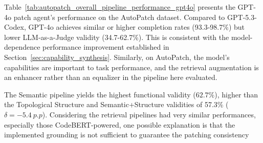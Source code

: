 Table~\ref{tab:autopatch_overall_pipeline_performance_gpt4o} presents the GPT-4o patch agent's performance on the AutoPatch dataset. Compared to GPT-5.3-Codex, GPT-4o achieves similar or higher completion rates (93.3-98.7\%) but lower LLM-as-a-Judge validity (34.7-62.7\%). 
This is consistent with the model-dependence performance improvement established in Section~\ref{sec:capability_synthesis}.
Similarly, on AutoPatch, the model's capabilities are important to task performance, and the retrieval augmentation is an enhancer rather than an equalizer in the pipeline here evaluated.

The Semantic pipeline yields the highest functional validity ($62.7\%$), higher than the Topological Structure and Semantic+Structure validities of 57.3\% ($\delta=-5.4~p.p$). Considering the retrieval pipelines had very similar performances, especially those CodeBERT-powered, one possible explanation is that the implemented grounding is not sufficient to guarantee the patching consistency 


\begin{table}[H]
  \centering
  \caption{GPT-4o: Overall pipeline performance on the AutoPatch dataset}
  \label{tab:autopatch_overall_pipeline_performance_gpt4o}
\end{table}


